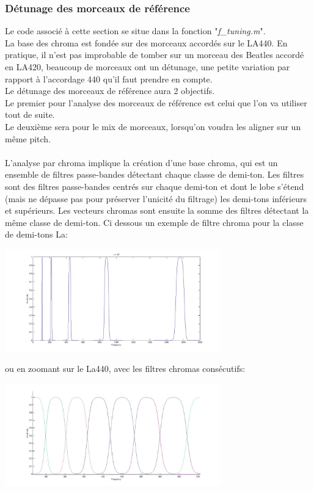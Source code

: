 \documentclass[12pt,a4paper]{article}
\begin{document}
\subsubsection{Détunage des morceaux de référence}
Le code associé à cette section se situe dans la fonction "\textit{f\_tuning.m}".
\\La base des chroma est fondée sur des morceaux accordés sur le LA440. En pratique, il n'est pas improbable de tomber sur un morceau des Beatles accordé en LA420, beaucoup de morceaux ont un détunage, une petite variation par rapport à l'accordage 440 qu'il faut prendre en compte. 
\\Le détunage des morceaux de référence aura 2 objectifs. 
\\Le premier pour l'analyse des morceaux de référence est celui que l'on va utiliser tout de suite.
\\Le deuxième sera pour le mix de morceaux, lorsqu'on voudra les aligner sur un même pitch.
\\
\\L'analyse par chroma implique la création d'une base chroma, qui est un ensemble de filtres passe-bandes détectant chaque classe de demi-ton. Les filtres sont des filtres passe-bandes centrés sur chaque demi-ton et dont le lobe s'étend (mais ne dépasse pas pour préserver l'unicité du filtrage) les demi-tons inférieurs et supérieurs. Les vecteurs chromas sont ensuite la somme des filtres détectant la même classe de demi-ton. Ci dessous un exemple de filtre chroma pour la classe de demi-tons La:

\begin{center}
\includegraphics[width=0.7\textwidth]{chroma_la_untuned.jpg}
\end{center}

ou en zoomant sur le La440, avec les filtres chromas consécutifs:

\begin{center}
\includegraphics[width=0.7\textwidth]{chroma_untuned_zoom.jpg}
\end{center}
\end{document}
